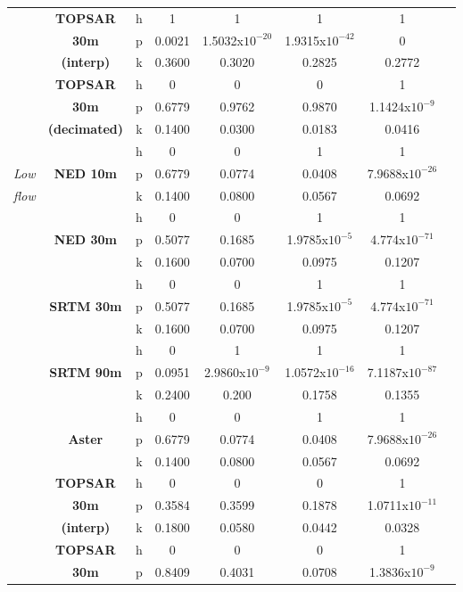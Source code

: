 \documentclass[12pt,letterpaper]{article}
\begin{document}
\begin{longtable}{p{1.3cm}ccccccc}
 &\textbf{TOPSAR}& h &1  & 1 & 1 &1 \\
  &  \textbf{30m}&p & 0.0021 & 1.5032x$10^{-20}$ & 1.9315x$10^{-42}$ &0 \\
   & \textbf{(interp)}&k & 0.3600 & 0.3020 &0.2825 & 0.2772 \\
   \cline{2-7}
 &\textbf{TOPSAR}& h &0  & 0 & 0 &1 \\
  &  \textbf{30m}&p & 0.6779 & 0.9762 & 0.9870 &1.1424x$10^{-9}$ \\
   & \textbf{(decimated)}&k & 0.1400 & 0.0300 &0.0183 & 0.0416 \\
   \cline{2-7}
  &\multirow{3}{*}{\textbf{NED 10m}}& h &0  & 0 & 1 &1 \\
   \textit{Low}& &p & 0.6779 & 0.0774 & 0.0408 &7.9688x$10^{-26}$ \\
    \textit{flow}&&k & 0.1400 & 0.0800 &0.0567 & 0.0692 \\
   \cline{2-7}
  &\multirow{3}{*}{\textbf{NED 30m}}& h &0  & 0 & 1 &1 \\
   & &p & 0.5077 & 0.1685 & 1.9785x$10^{-5}$ &4.774x$10^{-71}$ \\
   & &k & 0.1600 & 0.0700 &0.0975 & 0.1207 \\
   \cline{2-7}
 &\multirow{3}{*}{\textbf{SRTM 30m}}& h &0  & 0 & 1 &1 \\
   & &p & 0.5077 & 0.1685 & 1.9785x$10^{-5}$ &4.774x$10^{-71}$ \\
   & &k & 0.1600 & 0.0700 &0.0975 & 0.1207 \\
   \cline{2-7}
    &\multirow{3}{*}{\textbf{SRTM 90m}}&h & 0 &1 & 1 &1 \\
    &&p & 0.0951& 2.9860x$10^{-9}$ & 1.0572x$10^{-16}$ &7.1187x$10^{-87}$\\
    &&k & 0.2400 & 0.200 & 0.1758 &0.1355 \\ 
   \cline{2-7}
&  \multirow{3}{*}{\textbf{Aster}}& h &0  & 0 & 1 &1 \\
 &   &p & 0.6779 & 0.0774 & 0.0408 &7.9688x$10^{-26}$ \\
  &  &k & 0.1400 & 0.0800 &0.0567 & 0.0692 \\
    \hline
    \hline
     &\textbf{TOPSAR}& h &0  & 0 & 0 &1 \\
  &  \textbf{30m}&p & 0.3584 & 0.3599 & 0.1878 &1.0711x$10^{-11}$ \\
   & \textbf{(interp)}&k & 0.1800 & 0.0580 &0.0442 & 0.0328 \\
   \cline{2-7}
 &\textbf{TOPSAR}& h &0  & 0 & 0 &1 \\
  &  \textbf{30m}&p & 0.8409 & 0.4031 & 0.0708 &1.3836x$10^{-9}$ \\

\end{longtable}
\end{document}

